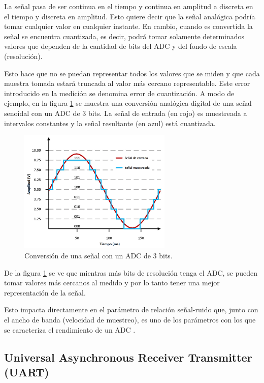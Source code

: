 La señal pasa de ser continua en el tiempo y continua en amplitud a discreta en el tiempo y discreta en amplitud. Esto quiere decir que la señal analógica podría tomar cualquier valor en cualquier instante. En cambio, cuando es convertida la señal se encuentra cuantizada, es decir, podrá tomar solamente determinados valores que dependen de la cantidad de bits del ADC y del fondo de escala (resolución).

Esto hace que no se puedan representar todos los valores que se miden y que cada muestra tomada estará truncada al valor más cercano representable. Este error introducido en la medición se denomina error de cuantización. A modo de ejemplo, en la figura \ref{fig:muestreoADC} se muestra una conversión analógica-digital de una señal senoidal con un ADC de 3 bits. La señal de entrada (en rojo) es muestreada a intervalos constantes y la señal resultante (en azul) está cuantizada.

\begin{figure}[H]
\centering
\includegraphics[width=0.65\textwidth]{./Figures/muestreo.png}
\caption{Conversión de una señal con un ADC de 3 bits.}
\label{fig:muestreoADC}
\end{figure}

De la figura \ref{fig:muestreoADC} se ve que mientras más bits de resolución tenga el ADC, se pueden tomar valores más cercanos al medido y por lo tanto tener una mejor representación de la señal.

Esto impacta directamente en el parámetro de relación señal-ruido que, junto con el ancho de banda (velocidad de muestreo), es uno de los parámetros con los que se caracteriza el rendimiento de un ADC \citep{WEBSITE:2}.

\subsection{Universal Asynchronous Receiver Transmitter (UART)}


